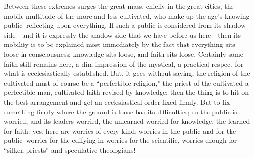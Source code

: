 \documentclass[12pt]{book}
\begin{document}
Between these extremes surges the great mass, chiefly in the great
cities, the mobile multitude of the more and less cultivated, who make
up the age's knowing public, reflecting upon everything. If such a
public is considered from its shadow side---and it is expressly the
shadow side that we have before us here---then its mobility is to be
explained most immediately by the fact that everything sits loose in
consciousness: knowledge sits loose, and faith sits loose. Certainly
some faith still remains here, a dim impression of the mystical, a
practical respect for what is ecclesiastically established. But, it
goes without saying, the religion of the cultivated must of course be a
``perfectible religion,'' the priest of the cultivated a perfectible
man, cultivated faith revised by knowledge; then the thing is to hit on
the best arrangement and get an ecclesiastical order fixed firmly. But
to fix something firmly where the ground is loose has its difficulties;
so the public is worried, and its leaders worried, the unlearned worried
for knowledge, the learned for faith: yes, here are worries of every
kind; worries in the public and for the public, worries for the edifying
in worries for the scientific, worries enough for ``silken priests'' and
speculative theologians!
\end{document}
